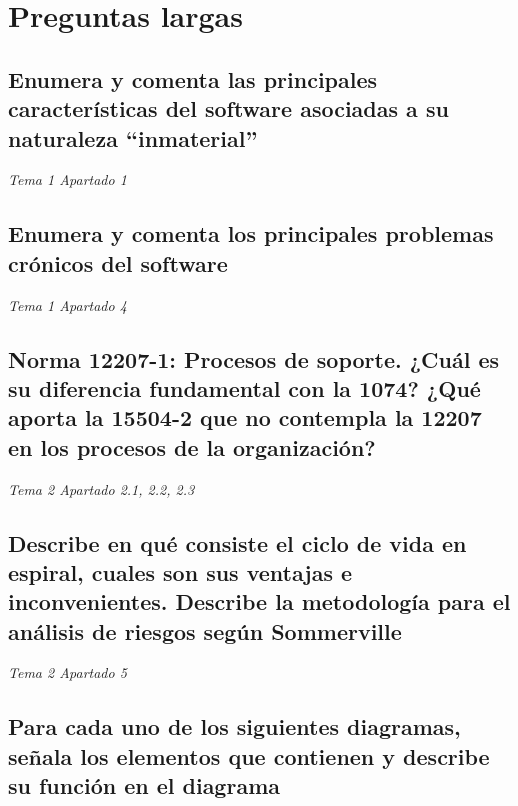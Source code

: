\section{Preguntas largas}
\subsection{Enumera y comenta las principales características del software asociadas a su naturaleza ``inmaterial''}
\textit{Tema 1 Apartado 1}

\subsection{Enumera y comenta los principales problemas crónicos del software}
\textit{Tema 1 Apartado 4}

\subsection{Norma 12207-1: Procesos de soporte. ¿Cuál es su diferencia fundamental con la 1074? ¿Qué aporta la 15504-2 que no contempla la 12207 en los procesos de la organización?}
\textit{Tema 2 Apartado 2.1, 2.2, 2.3}


\subsection{Describe en qué consiste el ciclo de vida en espiral, cuales son sus ventajas e inconvenientes. Describe la metodología para el análisis de riesgos según Sommerville}
\textit{Tema 2 Apartado 5}


\subsection{Para cada uno de los siguientes diagramas, señala los elementos que contienen y describe su función en el diagrama}

